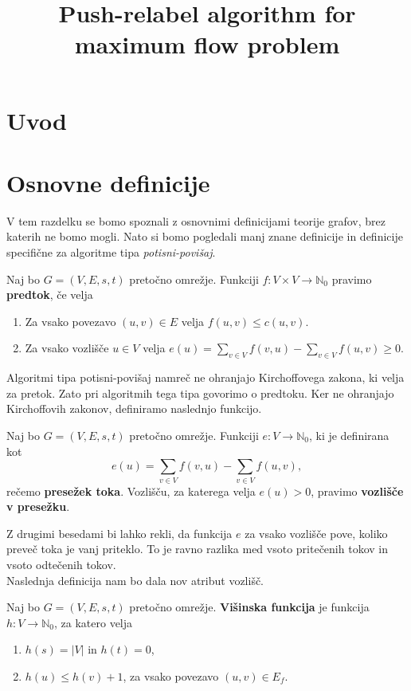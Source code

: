 \documentclass[mat1]{fmfdelo}
\title{Push-relabel algorithm for maximum flow problem}
\newcommand{\N}{\mathbb N}
\begin{document}
\section{Uvod}

\section{Osnovne definicije}

V tem razdelku se bomo spoznali z osnovnimi definicijami teorije grafov, brez katerih ne bomo mogli. Nato si bomo pogledali manj znane definicije in definicije specifične za algoritme tipa \textit{potisni-povišaj}.

\begin{definicija}
Naj bo $G=(V,E,s,t)$ pretočno omrežje. Funkciji $f \colon V \times V \rightarrow \N_0$ pravimo \textbf{predtok}, če velja

\begin{enumerate}
\item Za vsako povezavo $(u,v) \in E$ velja $f(u,v) \leq c(u,v)$.
\item Za vsako vozlišče $u \in V$ velja $e(u) = \sum_{v\in V} f(v,u) - \sum_{v\in V} f(u,v) \geq 0$.
\end{enumerate}
\end{definicija}

Algoritmi tipa potisni-povišaj namreč ne ohranjajo Kirchoffovega zakona, ki velja za pretok. Zato pri algoritmih tega tipa govorimo o predtoku. Ker ne ohranjajo Kirchoffovih zakonov, definiramo naslednjo funkcijo.

\begin{definicija}
Naj bo $G=(V,E,s,t)$ pretočno omrežje. Funkciji $e \colon V \rightarrow \N_0$, ki je definirana kot \[e(u) = \sum_{v \in V} f(v,u) - \sum_{v \in V} f(u,v),\] rečemo \textbf{presežek toka}. Vozlišču, za katerega velja $e(u) > 0$, pravimo \textbf{vozlišče v presežku}.
\end{definicija}

Z drugimi besedami bi lahko rekli, da funkcija $e$ za vsako vozlišče pove, koliko preveč toka je vanj priteklo. To je ravno razlika med vsoto pritečenih tokov in vsoto odtečenih tokov.\\

Naslednja definicija nam bo dala nov atribut vozlišč.

\begin{definicija}\label{def:visinska_funkcija}
Naj bo $G=(V,E,s,t)$ pretočno omrežje. \textbf{Višinska funkcija} je funkcija $h\colon V \rightarrow \N_0$, za katero velja
\begin{enumerate}
\item $h(s) = |V|$ in $h(t) = 0$,
\item $h(u) \leq h(v) + 1$, za vsako povezavo $(u,v) \in E_f$.
\end{enumerate}
\end{definicija}
\end{document}
